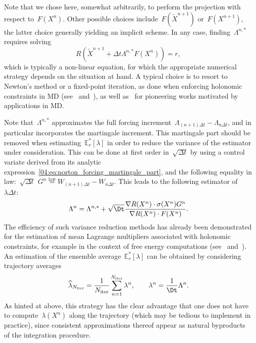 Note that we chose here, somewhat arbitrarily, to perform the projection with respect to~$F(X^n)$. Other possible choices include~$F(\widetilde{X}^{n+1})$ or~$F(X^{n+1})$, the latter choice generally yielding an implicit scheme. In any case, finding~$\Lambda^{n,*}$ requires solving
\[R\left(\widetilde{X}^{n+1} +\Delta t\Lambda^{n,*} F(X^n)\right)=r,\]
which is typically a non-linear equation, for which the appropriate numerical strategy depends on the situation at hand. A typical choice is to resort to Newton's method or a fixed-point iteration, as done when enforcing holonomic constraints in MD (see~\cite[Section VII.1]{HWL06} and~\cite[Chapter~7]{LR04}), as well as~\cite{RCB77,A83} for pioneering works motivated by applications in MD.

Note that~$\Lambda^{n,*}$ approximates the full forcing increment~$\Lambda_{(n+1)\Delta t}-\Lambda_{n\Delta t}$, and in particular incorporates the martingale increment. This martingale part should be removed when estimating~$\mathbb E_r^*[\lambda]$ in order to reduce the variance of the estimator under consideration. This can be done at first order in~$\sqrt{\Delta t}$ by using a control variate derived from its analytic expression~\eqref{04:eq:norton_forcing_martingale_part}, and the following equality in law:~$\sqrt{\Delta t}\,~G^n \overset{\mathrm{law}}{=}W_{(n+1)\Delta t}-W_{n\Delta t}$. This leads to the following estimator of~$\lambda\Delta t$:
\begin{equation}
\label{04:eq:norton_var_reduction}
    \Lambda^{n} = \Lambda^{n,*}+\sqrt{\Dt}\frac{\nabla R(X^n)\cdot \sigma(X^n)G^n}{\nabla R(X^n)\cdot F(X^n)}.
\end{equation}
The efficiency of such variance reduction methods has already been demonstrated for the estimation of mean Lagrange multipliers associated with holonomic constraints, for example in the context of free energy computations (see~\cite{CLVE08} and~\cite[Remark~3.33]{LRS10}).
An estimation of the ensemble average~$\mathbb E_r^*[\lambda]$ can be obtained by considering trajectory averages
\begin{equation}
    \label{04:eq:norton_lambda_n_definition}
    \widehat{\lambda}_{N_{\mathrm{iter}}} = \frac{1}{N_{\mathrm{iter}}} \sum_{n=1}^{N_{\mathrm{iter}}} \lambda^n,\qquad\lambda^{n} = \frac{1}{\Dt}\Lambda^n.
\end{equation}
As hinted at above, this strategy has the clear advantage that one does not have to compute~$\lambda(X^n)$ along the trajectory (which may be tedious to implement in practice), since consistent approximations thereof appear as natural byproducts of the integration procedure.

